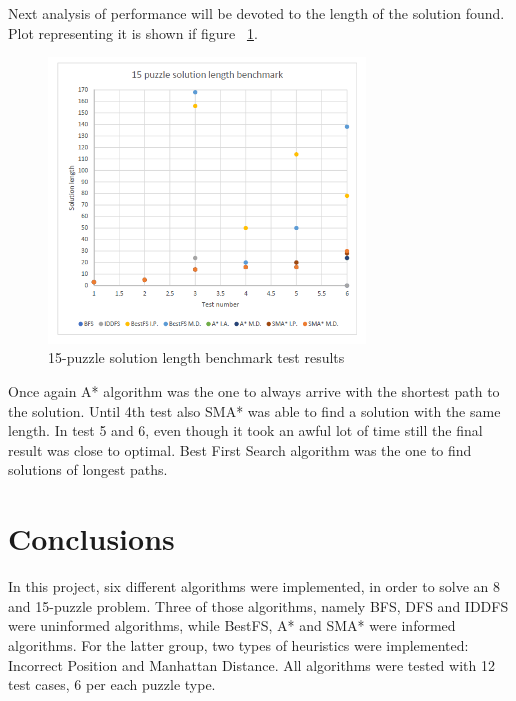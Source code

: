 \documentclass[12pt]{article}
\begin{document}
Next analysis of performance will be devoted to the length of the solution found. Plot representing it is shown if figure  ~\ref{fifteen-puzzle-plot-length}.

 \begin{figure}[h]
    \includegraphics[width=0.75\textwidth]{15_puzzle_length}
    \centering
    \caption{15-puzzle solution length benchmark test results}
\label {fifteen-puzzle-plot-length}
\end{figure}

Once again A* algorithm was the one to always arrive with the shortest path to the solution. Until 4th test also SMA* was able to find a solution with the same length. In test 5 and 6, even though it took an awful lot of time still the final result was close to optimal. Best First Search algorithm was the one to find solutions of longest paths.

\section {Conclusions}

In this project, six different algorithms were implemented, in order to solve an 8 and 15-puzzle problem. Three of those algorithms, namely BFS, DFS and IDDFS were uninformed algorithms, while BestFS, A* and SMA* were informed algorithms. For the latter group, two types of heuristics were implemented: Incorrect Position and Manhattan Distance. All algorithms were tested with 12 test cases, 6 per each puzzle type.
\end{document}
